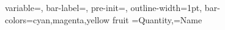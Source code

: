 \documentclass[12pt]{article}
\begin{document}
\DTLbarchart
{
 variable=\Quantity,%
 bar-label=\Name,
 pre-init={\DTLclearbarcolors},
 outline-width=1pt,
 bar-colors={cyan,magenta,yellow}
}
{fruit}%
{\Quantity=Quantity,\Name=Name}%
 
\end{document}
